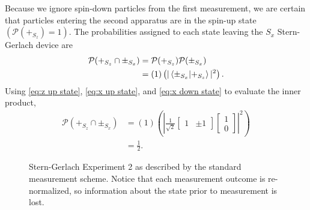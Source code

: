 Because we ignore spin-down particles from the first measurement, we are certain that particles entering the second apparatus are in the spin-up state $\left(\mathcal{P}(+_{S_z}) = 1 \right)$. The probabilities assigned to each state leaving the $S_x$ Stern-Gerlach device are
\begin{align} \label{eq:standard conditional probabilites}
    \mathcal{P}(+_{S_z} \cap \pm_{S_x}) &= \mathcal{P}(+_{S_z})\mathcal{P}(\pm_{S_x})  \\ \nonumber
    &= (1)\left(|\braket{\pm_{S_x}|+_{S_z}}|^2\right).
\end{align}
Using \autoref{eq:z up state}, \autoref{eq:x up state}, and \autoref{eq:x down state} to evaluate the inner product,
\begin{align}
  \mathcal{P}(+_{S_z} \cap \pm_{S_x}) &= (1)\left(\left|
\frac{1}{\sqrt{2}}\begin{bmatrix} 1 & \pm 1 \end{bmatrix} \begin{bmatrix} 1 \\ 0 \end{bmatrix} \right|^2 \right) \\ \nonumber
  &= \frac{1}{2}.
\end{align}

\begin{figure}
\centering\CaptionFontSize
{}
\caption[Standard approach to Stern-Gerlach Experiment 2]
{Stern-Gerlach Experiment 2 as described by the standard measurement scheme. Notice that each measurement outcome is re-normalized, so information about the state prior to measurement is lost.}
\label{Figure:Measurement:Copenhagen Experiment 2}
\end{figure}

